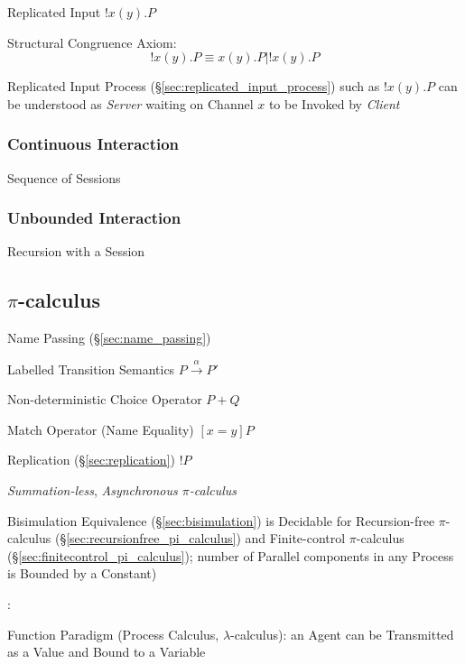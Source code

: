 Replicated Input $!x(y).P$

Structural Congruence Axiom:
\[
  !x(y).P \equiv x(y).P | !x(y).P
\]

Replicated Input Process (\S\ref{sec:replicated_input_process}) such
as $!x(y).P$ can be understood as \emph{Server} waiting on Channel $x$
to be Invoked by \emph{Client}



\subsubsection{Continuous Interaction}\label{sec:continuous_interaction}

Sequence of Sessions



\subsubsection{Unbounded Interaction}\label{sec:unbounded_interaction}

Recursion with a Session



\subsection{$\pi$-calculus}\label{sec:pi_calculus}

Name Passing (\S\ref{sec:name_passing})

Labelled Transition Semantics $P \xrightarrow{\alpha} P'$

Non-deterministic Choice Operator $P + Q$

Match Operator (Name Equality) $[x=y]P$

Replication (\S\ref{sec:replication}) $!P$

\emph{Summation-less}, \emph{Asynchronous
  $\pi$-calculus} %
\cite{honda-vasconcelos-kubo98}

Bisimulation Equivalence (\S\ref{sec:bisimulation}) is Decidable for
Recursion-free $\pi$-calculus (\S\ref{sec:recursionfree_pi_calculus})
and Finite-control $\pi$-calculus
(\S\ref{sec:finitecontrol_pi_calculus}); number of Parallel components
in any Process is Bounded by a Constant)

\cite{milner90}:

Function Paradigm (Process Calculus, $\lambda$-calculus): an Agent can
be Transmitted as a Value and Bound to a Variable

